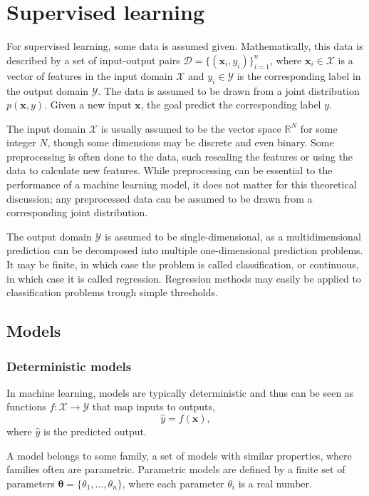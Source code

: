 \section{Supervised learning}
For supervised learning, some data is assumed given.
Mathematically, this data is described by a set of input-output pairs $\mathcal{D} = \{(\bm{x}_i, y_i)\}_{i=1}^n$, where $\bm{x}_i\in\mathcal{X}$ is a vector of features in the input domain $\mathcal{X}$ and $y_i\in\mathcal{Y}$ is the corresponding label in the output domain $\mathcal{Y}$.
The data is assumed to be drawn from a joint distribution $p(\bm{x}, y)$.
Given a new input $\bm{x}$, the goal predict the corresponding label $y$.

The input domain $\mathcal{X}$ is usually assumed to be the vector space $\mathbb{R}^N$ for some integer $N$, though some dimensions may be discrete and even binary.
Some preprocessing is often done to the data, such rescaling the features or using the data to calculate new features.
While preprocessing can be essential to the performance of a machine learning model, it does not matter for this theoretical discussion; any preprocessed data can be assumed to be drawn from a corresponding joint distribution.

The output domain $\mathcal{Y}$ is assumed to be single-dimensional, as a multidimensional prediction can be decomposed into multiple one-dimensional prediction problems.
It may be finite, in which case the problem is called classification, or continuous, in which case it is called regression.
Regression methods may easily be applied to classification problems trough simple thresholds.

\subsection{Models}
\subsubsection{Deterministic models}
In machine learning, models are typically deterministic and thus can be seen as functions $f:\mathcal{X}\to\mathcal{Y}$ that map inputs to outputs,
\begin{equation}
    \hat{y} = f(\bm{x}),
\end{equation}
where $\hat{y}$ is the predicted output.

A model belongs to some family, a set of models with similar properties, where families often are parametric.
Parametric models are defined by a finite set of parameters $\bm{\theta}= \{\theta_1, \ldots, \theta_n\}$, where each parameter $\theta_i$ is a real number.

